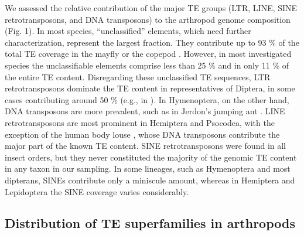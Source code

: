 We assessed the relative contribution of the major TE groups (LTR, LINE,
SINE retrotransposons, and DNA transposons) to the arthropod genome
composition (Fig. 1). In most species, ``unclassified'' elements, which
need further characterization, represent the largest fraction. They
contribute up to 93 \% of the total TE coverage in the mayfly
 or the copepod .
However, in most investigated  species the
unclassifiable elements comprise less than 25 \% and in  only 11 \% of the entire TE content. Disregarding these
unclassified TE sequences, LTR retrotransposons dominate the TE content
in representatives of Diptera, in some cases contributing around 50 \%
(e.g., in ). In Hymenoptera, on the other hand, DNA
transposons are more prevalent, such as in Jerdon's jumping ant
. LINE retrotransposons are most
prominent in Hemiptera and Psocodea, with the exception of the human
body louse , whose DNA transposons contribute
the major part of the known TE content. SINE retrotransposons were found
in all insect orders, but they never constituted the majority of the
genomic TE content in any taxon in our sampling. In some lineages, such
as Hymenoptera and most dipterans, SINEs contribute only a miniscule
amount, whereas in Hemiptera and Lepidoptera the SINE coverage varies
considerably.



\subsection{Distribution of TE superfamilies in
arthropods}\label{distribution-of-te-superfamilies-in-arthropods}

